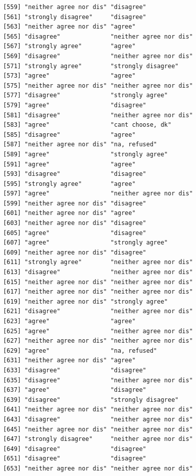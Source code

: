 \documentclass{beamer}\usepackage[]{graphicx}\usepackage[]{color}
\makeatletter
\newenvironment{kframe}{%
 \def\at@end@of@kframe{}%
 \ifinner\ifhmode%
  \def\at@end@of@kframe{\end{minipage}}%
  \begin{minipage}{\columnwidth}%
 \fi\fi%
 \def\FrameCommand##1{\hskip\@totalleftmargin \hskip-\fboxsep
 \colorbox{shadecolor}{##1}\hskip-\fboxsep
     \hskip-\linewidth \hskip-\@totalleftmargin \hskip\columnwidth}%
 \MakeFramed {\advance\hsize-\width
   \@totalleftmargin\z@ \linewidth\hsize
   \@setminipage}}%
 {\par\unskip\endMakeFramed%
 \at@end@of@kframe}
\newenvironment{knitrout}{}{} %
\makeatother
\begin{document}
\begin{frame}[fragile]
\begin{knitrout}
\begin{kframe}
\begin{verbatim}
 [559] "neither agree nor dis" "disagree"             
 [561] "strongly disagree"     "disagree"             
 [563] "neither agree nor dis" "agree"                
 [565] "disagree"              "neither agree nor dis"
 [567] "strongly agree"        "agree"                
 [569] "disagree"              "neither agree nor dis"
 [571] "strongly agree"        "strongly disagree"    
 [573] "agree"                 "agree"                
 [575] "neither agree nor dis" "neither agree nor dis"
 [577] "disagree"              "strongly agree"       
 [579] "agree"                 "disagree"             
 [581] "disagree"              "neither agree nor dis"
 [583] "agree"                 "cant choose, dk"      
 [585] "disagree"              "agree"                
 [587] "neither agree nor dis" "na, refused"          
 [589] "agree"                 "strongly agree"       
 [591] "agree"                 "agree"                
 [593] "disagree"              "disagree"             
 [595] "strongly agree"        "agree"                
 [597] "agree"                 "neither agree nor dis"
 [599] "neither agree nor dis" "disagree"             
 [601] "neither agree nor dis" "agree"                
 [603] "neither agree nor dis" "disagree"             
 [605] "agree"                 "disagree"             
 [607] "agree"                 "strongly agree"       
 [609] "neither agree nor dis" "disagree"             
 [611] "strongly agree"        "neither agree nor dis"
 [613] "disagree"              "neither agree nor dis"
 [615] "neither agree nor dis" "neither agree nor dis"
 [617] "neither agree nor dis" "neither agree nor dis"
 [619] "neither agree nor dis" "strongly agree"       
 [621] "disagree"              "neither agree nor dis"
 [623] "agree"                 "agree"                
 [625] "agree"                 "neither agree nor dis"
 [627] "neither agree nor dis" "neither agree nor dis"
 [629] "agree"                 "na, refused"          
 [631] "neither agree nor dis" "agree"                
 [633] "disagree"              "disagree"             
 [635] "disagree"              "neither agree nor dis"
 [637] "agree"                 "disagree"             
 [639] "disagree"              "strongly disagree"    
 [641] "neither agree nor dis" "neither agree nor dis"
 [643] "disagree"              "neither agree nor dis"
 [645] "neither agree nor dis" "neither agree nor dis"
 [647] "strongly disagree"     "neither agree nor dis"
 [649] "disagree"              "disagree"             
 [651] "disagree"              "disagree"             
 [653] "neither agree nor dis" "neither agree nor dis"

\end{verbatim}
\end{kframe}
\end{knitrout}
\end{frame}
\end{document}
